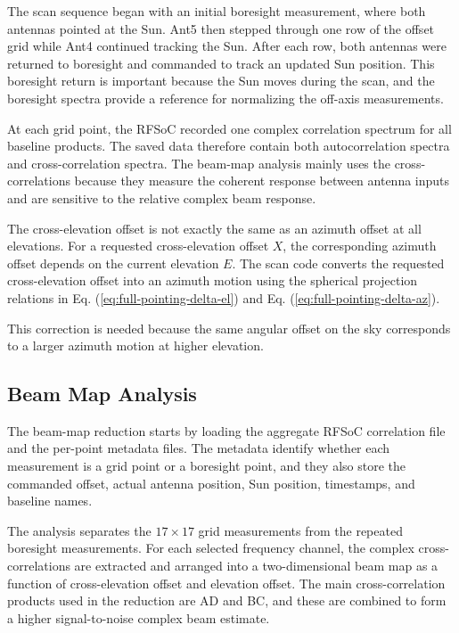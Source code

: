 \documentclass[12pt]{extarticle}
\begin{document}
The scan sequence began with an initial boresight measurement, where both
antennas pointed at the Sun. Ant5 then stepped through one row of the offset
grid while Ant4 continued tracking the Sun. After each row, both antennas were
returned to boresight and commanded to track an updated Sun position. This
boresight return is important because the Sun moves during the scan, and the
boresight spectra provide a reference for normalizing the off-axis measurements.

At each grid point, the RFSoC recorded one complex correlation spectrum for all
baseline products. The saved data therefore contain both autocorrelation spectra
and cross-correlation spectra. The beam-map analysis mainly uses the
cross-correlations because they measure the coherent response between antenna
inputs and are sensitive to the relative complex beam response.

The cross-elevation offset is not exactly the same as an azimuth offset at all
elevations. For a requested cross-elevation offset \(X\), the corresponding
azimuth offset depends on the current elevation \(E\). The scan code converts the
requested cross-elevation offset into an azimuth motion using the spherical projection relations in Eq. (\ref{eq:full-pointing-delta-el}) and Eq. (\ref{eq:full-pointing-delta-az}).

This correction is needed because the same angular offset on the sky corresponds
to a larger azimuth motion at higher elevation.

\subsection{Beam Map Analysis}

The beam-map reduction starts by loading the aggregate RFSoC correlation file
and the per-point metadata files. The metadata identify whether each measurement
is a grid point or a boresight point, and they also store the commanded offset,
actual antenna position, Sun position, timestamps, and baseline names.

The analysis separates the \(17\times17\) grid measurements from the repeated
boresight measurements. For each selected frequency channel, the complex
cross-correlations are extracted and arranged into a two-dimensional beam map as
a function of cross-elevation offset and elevation offset. The main
cross-correlation products used in the reduction are AD and BC, and these are
combined to form a higher signal-to-noise complex beam estimate.
\end{document}
